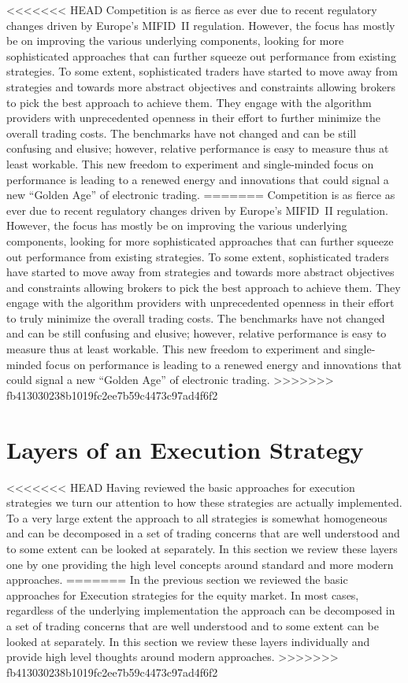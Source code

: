 <<<<<<< HEAD
Competition is as fierce as ever due to recent regulatory changes driven by Europe's MIFID~II regulation. However, the focus has mostly be on improving the various underlying components, looking for more sophisticated approaches that can further squeeze out performance from existing strategies. To some extent, sophisticated traders have started to move away from strategies and towards more abstract objectives and constraints allowing brokers to pick the best approach to achieve them. They engage with the algorithm providers with unprecedented openness in their effort to further minimize the overall trading costs. The benchmarks have not changed and can be still confusing and elusive; however, relative performance is easy to measure thus at least workable. This new freedom to experiment and single-minded focus on performance is leading to a renewed energy and innovations that could signal a new ``Golden Age'' of electronic trading.
=======
Competition is as fierce as ever due to recent regulatory changes driven by Europe's MIFID~II regulation. However, the focus has mostly be on improving the various underlying components, looking for more sophisticated approaches that can further squeeze out performance from existing strategies. To some extent, sophisticated traders have started to move away from strategies and towards more abstract objectives and constraints allowing brokers to pick the best approach to achieve them. They engage with the algorithm providers with unprecedented openness in their effort to truly minimize the overall trading costs. The benchmarks have not changed and can be still confusing and elusive; however, relative performance is easy to measure thus at least workable. This new freedom to experiment and single-minded focus on performance is leading to a renewed energy and innovations that could signal a new ``Golden Age'' of electronic trading.
>>>>>>> fb413030238b1019fc2ee7b59c4473c97ad4f6f2



\section{Layers of an Execution Strategy}

<<<<<<< HEAD
Having reviewed the basic approaches for execution strategies we turn our attention to how these strategies are actually implemented. To a very large extent the approach to all strategies is somewhat homogeneous and can be decomposed in a set of trading concerns that are well understood and to some extent can be looked at separately. In this section we review these layers one by one providing the high level concepts around standard and more modern approaches.
=======
In the previous section we reviewed the basic approaches for Execution strategies for the equity market. In most cases, regardless of the underlying implementation the approach can be decomposed in a set of trading concerns that are well understood and to some extent can be looked at separately. In this section we review these layers individually and provide high level thoughts around modern approaches.
>>>>>>> fb413030238b1019fc2ee7b59c4473c97ad4f6f2

